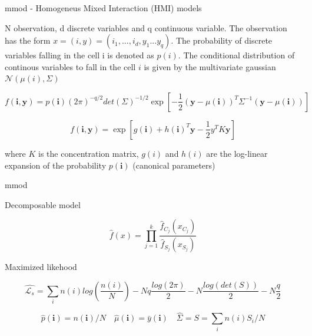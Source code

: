 \documentclass{beamer}
\begin{document}
\begin{frame}{mmod - Homogeneus Mixed Interaction (HMI) models}
\begin{center}
N observation, d discrete variables and q continuous variable. The observation has the form $x=(i,y)=(i_{1},...,i_{d},y_{1}...y_{q})$. The probability of discrete variables falling in the cell i is denoted as $p(i)$. The conditional distribution of continous variables to fall in the cell $i$ is given by the multivariate gaussian $\mathcal{N}(\mu(i),\Sigma)$
\end{center}

\begin{equation}
f(\textbf{i},\textbf{y})= p(\textbf{i})(2\pi)^{-q/2}det(\Sigma)^{-1/2}\exp\left[-\dfrac{1}{2}\left(\textbf{y}-\mu(\textbf{i})\right)^{T}\Sigma^{-1}\left(\textbf{y}-\mu(\textbf{i})\right)\right]
\label{gaussMix}
\end{equation}

\begin{equation}
f(\textbf{i},\textbf{y})=\exp\left[g(\textbf{i}) +h(\textbf{i})^{T}\textbf{y}-\frac{1}{2}y^{T}K\textbf{y}\right]
\end{equation}

\begin{center}
where $K$ is the concentration matrix, $g(i)$ and $h(i)$ are the log-linear expansion of the probability $p(\textbf{i})$ (canonical parameters)
\end{center}

\end{frame}
\begin{frame}{mmod}
\begin{center}
Decomposable model
\end{center}
\begin{equation}
\hat{f}(x)=\prod_{j=1}^{k}\dfrac{\hat{f}_{C_{j}}(x_{C}_{j})}{\hat{f}_{S_{j}}(x_{S}_{j})} 
\end{equation}
\begin{center}
Maximized likehood
\end{center}
\begin{equation}
\hat{\mathcal{L}_{s}}=\sum_{i}n(i)log\left(\dfrac{n(i)}{N}\right)-Nq\dfrac{log(2\pi)}{2}-N\dfrac{log(det(S))}{2}-N\frac{q}{2}
\end{equation}

\begin{equation}
\hat{p}(\textbf{i})=n(\textbf{i})/N \quad \hat{\mu}(\textbf{i})=\bar{y}(\textbf{i})\quad\hat{\Sigma}=S=\sum_{i}n(i)S_{i}/N
\end{equation}

\end{frame}
\end{document}
